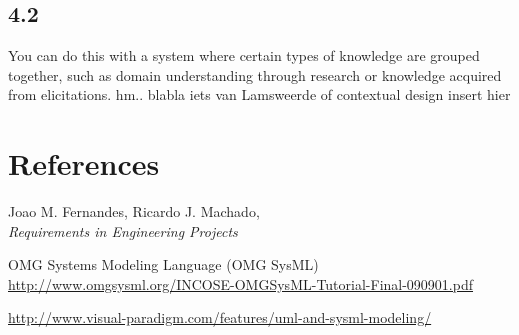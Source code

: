 \section*{4.2}
You can do this with a system where certain types of knowledge are grouped together, such as domain understanding through research or knowledge acquired from elicitations. hm.. blabla iets van Lamsweerde of contextual design insert hier

\chapter{References}

\begin{thebibliography}{9}
	
	Joao M. Fernandes, Ricardo J. Machado, \\
	\emph{Requirements in Engineering Projects}
	
	OMG Systems Modeling Language (OMG SysML) \\
	\url{http://www.omgsysml.org/INCOSE-OMGSysML-Tutorial-Final-090901.pdf}
	
	\url{http://www.visual-paradigm.com/features/uml-and-sysml-modeling/}
	
\end{thebibliography}


\appendix



